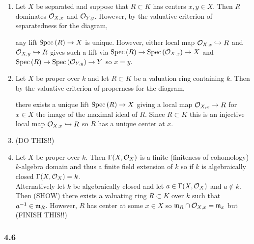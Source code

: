 \documentclass[12pt]{article}
\begin{document}
\begin{enumerate}
\item Let $X$ be separated and suppose that $R \subset K$ has centers $x,y \in X$. Then $R$ dominates $\mathcal{O}_{X, x}$ and $\mathcal{O}_{Y, y}$. However, by the valuative criterion of separatedness for the diagram,
\begin{center}
\end{center}
any lift $\mathrm{Spec}\left( R \right) \to X$ is unique. However, either local map $\mathcal{O}_{X, x} \hookrightarrow R$ and $\mathcal{O}_{X, y} \hookrightarrow R$ gives such a lift via $\mathrm{Spec}\left( R \right) \to \mathrm{Spec}\left( \mathcal{O}_{X, x} \right) \to X$ and $\mathrm{Spec}\left( R \right) \to \mathrm{Spec}\left( \mathcal{O}_{Y, y} \right) \to Y$ so $x = y$.

\item Let $X$ be proper over $k$ and let $R \subset K$ be a valuation ring containing $k$. Then by the valuative criterion of properness for the diagram,
\begin{center}
\end{center}
there exists a unique lift $\mathrm{Spec}\left( R \right) \to X$ giving a local map $\mathcal{O}_{X, x} \to R$ for $x \in X$ the image of the maximal ideal of $R$. Since $R \subset K$ this is an injective local map $\mathcal{O}_{X, x} \hookrightarrow R$ so $R$ has a unique center at $x$.

\item (DO THIS!!)

\item Let $X$ be proper over $k$. Then $\Gamma(X, \mathcal{O}_{X})$ is a finite (finiteness of cohomology) $k$-algebra domain and thus a finite field extension of $k$ so if $k$ is algebraically closed $\Gamma(X, \mathcal{O}_{X}) = k$.
\bigskip\\
Alternatively let $k$ be algebraically closed and let $a \in \Gamma(X, \mathcal{O}_{X})$ and $a \notin k$. Then (SHOW) there exists a valuating ring $R \subset K$ over $k$ such that $a^{-1} \in \mathfrak{m}_R$. However, $R$ has center at some $x \in X$ so $\mathfrak{m}_R \cap \mathcal{O}_{X, x} = \mathfrak{m}_x$ but (FINISH THIS!!)  
\end{enumerate}

\subsubsection{4.6}
\end{document}
